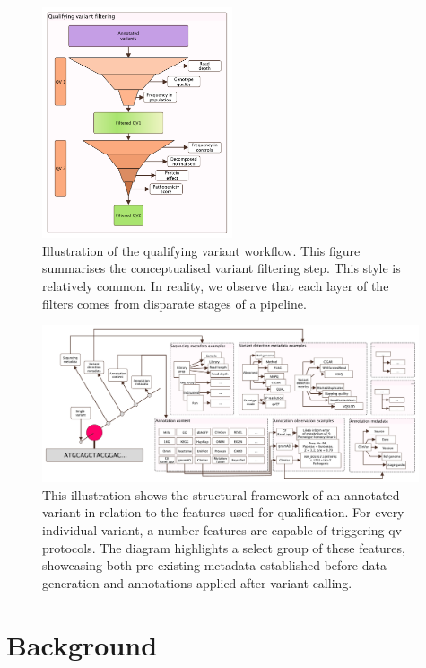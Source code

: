 \begin{figure}[h]
\centering
     \includegraphics[width=0.5\textwidth]{./images/qv_filter_pyramid_vcurrent.pdf}
\caption{Illustration of the qualifying variant workflow. This figure summarises the conceptualised variant filtering step. This style is relatively common. In reality, we observe that each layer of the filters comes from disparate stages of a pipeline.}
    \label{fig:qv_filter_pyramid_vcurrent}
\end{figure}

\begin{figure}[h]
\centering
     \includegraphics[width=0.99\textwidth]{./images/qv_structure_vcurrent.pdf}
\caption{This illustration shows the structural framework of an annotated variant in relation to the features used for qualification. For every individual variant, a number features are capable of triggering \ac{qv} protocols. The diagram highlights a select group of these features, showcasing both pre-existing metadata established before data generation and annotations applied after variant calling.}
\label{fig:qv_structure_vcurrent}
\end{figure}

\clearpage
\section{Background}
